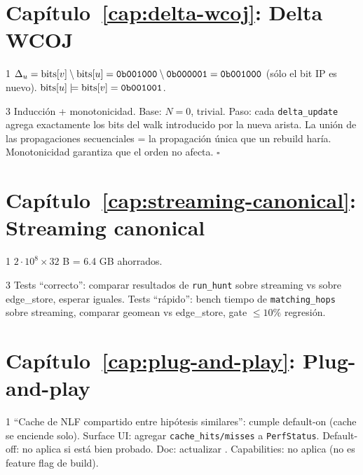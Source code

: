\section*{Capítulo~\ref{cap:delta-wcoj}: Delta WCOJ}

\begin{solucion}{1}
\(\Delta_u = \mathrm{bits}[v] \setminus \mathrm{bits}[u] = \texttt{0b001000}
\setminus \texttt{0b000001} = \texttt{0b001000}\) (sólo el bit IP
es nuevo). \(\mathrm{bits}[u] \mathrel{|}\!= \mathrm{bits}[v] = \texttt{0b001001}\).
\end{solucion}

\begin{solucion}{3}
Inducción + monotonicidad. Base: \(N = 0\), trivial. Paso: cada
\texttt{delta\_update} agrega exactamente los bits del walk
introducido por la nueva arista. La unión de las propagaciones
secuenciales = la propagación única que un rebuild haría.
Monotonicidad garantiza que el orden no afecta. \(\square\)
\end{solucion}

\section*{Capítulo~\ref{cap:streaming-canonical}: Streaming canonical}

\begin{solucion}{1}
\(2 \cdot 10^8 \times 32\) B = 6.4 GB ahorrados.
\end{solucion}

\begin{solucion}{3}
Tests ``correcto'': comparar resultados de
\texttt{run\_hunt} sobre streaming vs sobre edge\_store, esperar
iguales. Tests ``rápido'': bench tiempo de
\texttt{matching\_hops} sobre streaming, comparar geomean vs
edge\_store, gate \(\leq 10\%\) regresión.
\end{solucion}

\section*{Capítulo~\ref{cap:plug-and-play}: Plug-and-play}

\begin{solucion}{1}
``Cache de NLF compartido entre hipótesis similares'': cumple
default-on (cache se enciende solo). Surface UI: agregar
\texttt{cache\_hits/misses} a \texttt{PerfStatus}. Default-off:
no aplica si está bien probado. Doc: actualizar
. Capabilities: no aplica (no es feature
flag de build).
\end{solucion}

